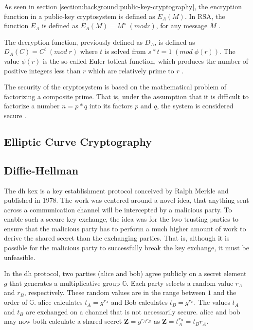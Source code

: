 As seen in section \ref{section:background:public-key-cryptography}, the encryption function in a public-key cryptosystem is defined as $E_A(M)$. In RSA, the function $E_A$ is defined as $E_A(M)=M^s\;(mod r)$, for any message $M$ \cite{rsa1977}.

The decryption function, previously defined as $D_A$, is defined as $D_A(C)=C^t\;(mod\;r)$ where $t$ is solved from $s*t=1\;(mod\;\phi(r))$. The value $\phi(r)$ is the so called Euler totient function, which produces the number of positive integers less than $r$ which are relatively prime to $r$ \cite{rsa1977}.

The security of the cryptosystem is based on the mathematical problem of factorizing a composite prime. That is, under the assumption that it is difficult to factorize a number $n=p*q$ into its factors $p$ and $q$, the system is considered secure \cite{rsa1977}.

\subsection{Elliptic Curve Cryptography}


\subsection{Diffie-Hellman}

The \gls{dh} \gls{kex} is a key establishment protocol conceived by Ralph Merkle and published in 1978\cite{merkle1978}. The work was centered around a novel idea, that anything sent across a communication channel will be intercepted by a malicious party. To enable such a secure key exchange, the idea was for the two trusting parties to ensure that the malicious party has to perform a much higher amount of work to derive the shared secret than the exchanging parties. That is, although it is possible for the malicious party to successfully break the key exchange, it must be unfeasible\cite{merkle1978}.

In the \gls{dh} protocol, two parties (\gls{alice} and \gls{bob}) agree publicly on a secret element $g$ that generates a multiplicative group $\mathbb{G}$. Each party selects a random value $r_A$ and $r_B$, respectively. These random values are in the range between $1$ and the order of $\mathbb{G}$. \gls{alice} calculates $t_A=g^{r_A}$ and Bob calculates $t_B=g^{r_B}$. The values $t_A$ and $t_B$ are exchanged on a channel that is not necessarily secure. \gls{alice} and \gls{bob} may now both calculate a shared secret $\mathbf{Z}=g^{r_A r_B}$ as $\mathbf{Z}=t_A^{r_B}=t_B{r_A}$\cite{merkle1978, boyd2020}.

